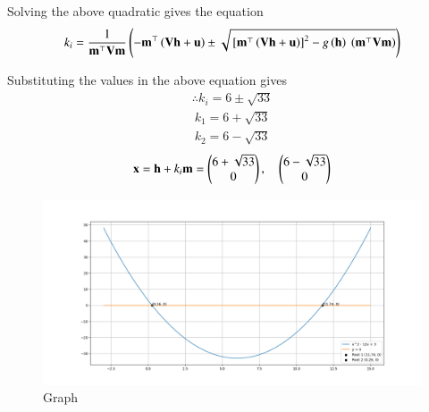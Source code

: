 \documentclass[journal]{IEEEtran}
\begin{document}
Solving the above quadratic gives the equation
\begin{align}
k_i = \frac{1}{\mathbf{m}^{\top}\mathbf{V}\mathbf{m}}
\left(
    -\mathbf{m}^{\top} \left(\mathbf{V}\mathbf{h} + \mathbf{u}\right)
    \pm
    \sqrt{ {}\left[\mathbf{m}^{\top}\left(\mathbf{V}\mathbf{h} + \mathbf{u}\right)\right]^2
    - g\left(\mathbf{h}\right) \ \left(\mathbf{m}^{\top}\mathbf{V}\mathbf{m}\right) }
    \right)
\end{align}

Substituting the values in the above equation gives
\begin{align}
\therefore k_i =6 \pm \sqrt{33}
\end{align}
\begin{align}
 k_1 = 6 + \sqrt{33}\\
 k_2 = 6 - \sqrt{33}
\end{align}
\begin{align}
    \mathbf{x} = \mathbf{h} + k_i\mathbf{m}
   = \begin{pmatrix}6 + \sqrt{33} \\ 0\end{pmatrix},\quad
     \begin{pmatrix}6 - \sqrt{33} \\ 0\end{pmatrix}
\end{align}
\begin{figure}[h]
    \centering
    \includegraphics[width=\columnwidth]{figs/figure_py.png}
    \caption{Graph}
    \label{fig:fig}
 \end{figure}
\end{document}
